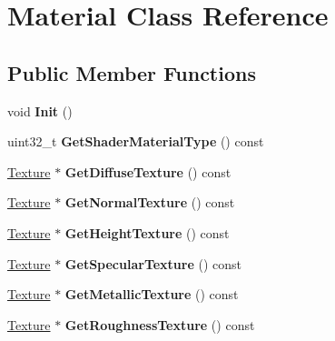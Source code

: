 \hypertarget{classMaterial}{}\section{Material Class Reference}
\label{classMaterial}
\subsection*{Public Member Functions}
\begin{DoxyCompactItemize}
\item 
\mbox{\label{classMaterial_aba9619e1e3776d59fe5d92e2d08cb6bc}} 
void {\bfseries Init} ()
\item 
\mbox{\label{classMaterial_a22f3cbf6ae1a551a73138673f8c019f2}} 
uint32\+\_\+t {\bfseries Get\+Shader\+Material\+Type} () const
\item 
\mbox{\label{classMaterial_a1b9db07af0385115afb5d16056a93f88}} 
\hyperlink{classTexture}{Texture} $\ast$ {\bfseries Get\+Diffuse\+Texture} () const
\item 
\mbox{\label{classMaterial_a308bae8e2917d3dabceb2921c87d6e6f}} 
\hyperlink{classTexture}{Texture} $\ast$ {\bfseries Get\+Normal\+Texture} () const
\item 
\mbox{\label{classMaterial_a7fee2a74eae077dfea902c05ef438326}} 
\hyperlink{classTexture}{Texture} $\ast$ {\bfseries Get\+Height\+Texture} () const
\item 
\mbox{\label{classMaterial_a0d3d4ef96719146ae94a36500f603a35}} 
\hyperlink{classTexture}{Texture} $\ast$ {\bfseries Get\+Specular\+Texture} () const
\item 
\mbox{\label{classMaterial_a29ba7e0e96585a71dbc639ef1f576f04}} 
\hyperlink{classTexture}{Texture} $\ast$ {\bfseries Get\+Metallic\+Texture} () const
\item 
\mbox{\label{classMaterial_a6b55a54f7f10121c760abb79f2f7a410}} 
\hyperlink{classTexture}{Texture} $\ast$ {\bfseries Get\+Roughness\+Texture} () const
\item 
\mbox{\label{classMaterial_af34f2b2d5ef3ee26f81dd9fc7e90162f}} 

\end{DoxyCompactItemize}
